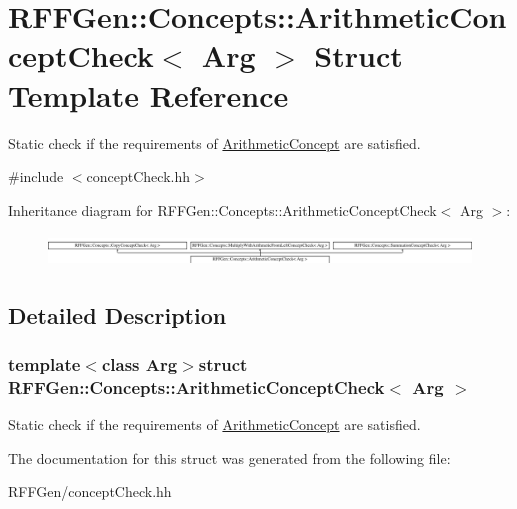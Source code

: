 \hypertarget{structRFFGen_1_1Concepts_1_1ArithmeticConceptCheck}{\section{R\-F\-F\-Gen\-:\-:Concepts\-:\-:Arithmetic\-Concept\-Check$<$ Arg $>$ Struct Template Reference}
\label{structRFFGen_1_1Concepts_1_1ArithmeticConceptCheck}
}


Static check if the requirements of \hyperlink{structRFFGen_1_1Concepts_1_1ArithmeticConcept}{Arithmetic\-Concept} are satisfied.  




{\ttfamily \#include $<$concept\-Check.\-hh$>$}

Inheritance diagram for R\-F\-F\-Gen\-:\-:Concepts\-:\-:Arithmetic\-Concept\-Check$<$ Arg $>$\-:\begin{figure}[H]
\begin{center}
\leavevmode
\includegraphics[height=0.860215cm]{structRFFGen_1_1Concepts_1_1ArithmeticConceptCheck}
\end{center}
\end{figure}


\subsection{Detailed Description}
\subsubsection*{template$<$class Arg$>$struct R\-F\-F\-Gen\-::\-Concepts\-::\-Arithmetic\-Concept\-Check$<$ Arg $>$}

Static check if the requirements of \hyperlink{structRFFGen_1_1Concepts_1_1ArithmeticConcept}{Arithmetic\-Concept} are satisfied. 

The documentation for this struct was generated from the following file\-:\begin{DoxyCompactItemize}
\item 
R\-F\-F\-Gen/concept\-Check.\-hh\end{DoxyCompactItemize}
